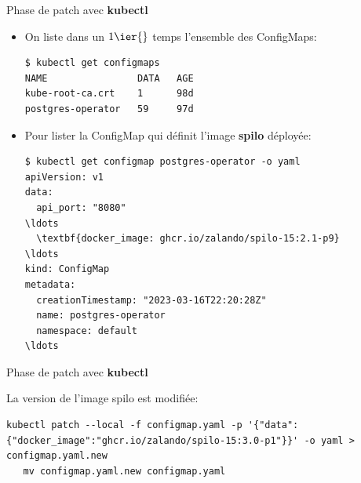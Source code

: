 
\begin{frame}[fragile]{Phase de patch avec \textbf{kubectl}}

\begin{itemize}
   \item On liste dans un $1\ier{}$ temps l'ensemble des ConfigMaps:
      \begin{tiny}
      \begin{Verbatim}[commandchars=\&\{\}]
$ kubectl get configmaps
NAME                DATA   AGE
kube-root-ca.crt    1      98d
postgres-operator   59     97d
      \end{Verbatim}
      \end{tiny}

   \item Pour lister la ConfigMap qui définit l'image \textbf{spilo} déployée:
\begin{tiny}
\begin{Verbatim}[commandchars=\\\{\}]
$ kubectl get configmap postgres-operator -o yaml
apiVersion: v1               
data:               
  api_port: "8080"     
\ldots
  \textbf{docker_image: ghcr.io/zalando/spilo-15:2.1-p9}
\ldots
kind: ConfigMap
metadata:
  creationTimestamp: "2023-03-16T22:20:28Z"
  name: postgres-operator
  namespace: default
\ldots
\end{Verbatim}
\end{tiny}
\end{itemize}

\end{frame}


\begin{frame}[fragile]{Phase de patch avec \textbf{kubectl}}

   La version de l'image spilo est modifiée:
\begin{itemize}
\begin{tiny}
\begin{Verbatim}[commandchars=\\\{\}]
   kubectl patch --local -f configmap.yaml -p '{"data":{"docker_image":"ghcr.io/zalando/spilo-15:3.0-p1"}}' -o yaml > configmap.yaml.new
   mv configmap.yaml.new configmap.yaml
\end{Verbatim}
\end{tiny}
\end{itemize}

\end{frame}

